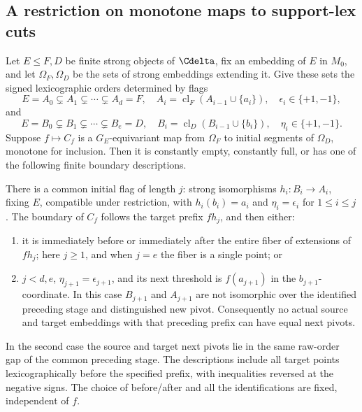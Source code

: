 \subsection{A restriction on monotone maps to support-lex cuts}

\begin{lemma}
\label{G:monotone-lex-cuts}
Let $E\le F,D$ be finite strong objects of $\Cdelta$, fix an
embedding of $E$ in $M_0$, and let $\Omega_F,\Omega_D$ be the
sets of strong embeddings extending it. Give these sets the
signed lexicographic orders determined by flags
\[
 E=A_0\subsetneq A_1\subsetneq\cdots\subsetneq A_d=F,
 \quad A_i=\operatorname{cl}_F(A_{i-1}\cup\{a_i\}),
 \quad \epsilon_i\in\{+1,-1\},
\]
and
\[
 E=B_0\subsetneq B_1\subsetneq\cdots\subsetneq B_e=D,
 \quad B_i=\operatorname{cl}_D(B_{i-1}\cup\{b_i\}),
 \quad \eta_i\in\{+1,-1\}.
\]
Suppose $f\mapsto C_f$ is a $G_E$-equivariant map from
$\Omega_F$ to initial segments of $\Omega_D$, monotone for
inclusion. Then it is constantly empty, constantly full, or
has one of the following finite boundary descriptions.

There is a common initial flag of length $j$: strong
isomorphisms $h_i:B_i\to A_i$, fixing $E$, compatible under
restriction, with $h_i(b_i)=a_i$ and
$\eta_i=\epsilon_i$ for $1\le i\le j$. The boundary of
$C_f$ follows the target prefix $f h_j$, and then either:
\begin{enumerate}
\item it is immediately before or immediately after the
entire fiber of extensions of $f h_j$; here $j\ge1$, and
when $j=e$ the fiber is a single point; or
\item $j<d,e$, $\eta_{j+1}=\epsilon_{j+1}$, and its next
threshold is $f(a_{j+1})$ in the $b_{j+1}$-coordinate.
In this case $B_{j+1}$ and $A_{j+1}$ are not isomorphic
over the identified preceding stage and distinguished new
pivot. Consequently no actual source and target embeddings
with that preceding prefix can have equal next pivots.
\end{enumerate}
In the second case the source and target next pivots lie in
the same raw-order gap of the common preceding stage.
The descriptions include all target points lexicographically
before the specified prefix, with inequalities reversed at
the negative signs. The choice of before/after and all the
identifications are fixed, independent of $f$.
\end{lemma}
